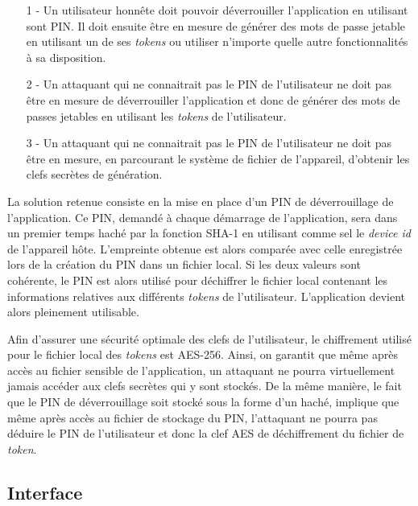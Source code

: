 \begin{itemize}
  \item[1 -] Un utilisateur honnête doit pouvoir déverrouiller l'application en utilisant 
  sont PIN. Il doit ensuite être en mesure de générer des mots de passe jetable en utilisant
  un de ses \emph{tokens} ou utiliser n'importe quelle autre fonctionnalités à sa
  disposition.
  \item[2 -] Un attaquant qui ne connaitrait pas le PIN de l'utilisateur ne doit pas être en
  mesure de déverrouiller l'application et donc de générer des mots de passes jetables en
  utilisant les \emph{tokens} de l'utilisateur.
  \item[3 -] Un attaquant qui ne connaitrait pas le PIN de l'utilisateur ne doit pas être en
  mesure, en parcourant le système de fichier de l'appareil, d'obtenir les clefs secrètes
  de génération.
\end{itemize}

La solution retenue consiste en la mise en place d'un PIN de déverrouillage de l'application.
Ce PIN, demandé à chaque démarrage de l'application, sera dans un premier temps haché par la
fonction SHA-1 en utilisant comme sel le \emph{device id} de l'appareil hôte. L'empreinte 
obtenue est alors comparée avec celle enregistrée lors de la création du PIN dans un fichier
local. Si les deux valeurs sont cohérente, le PIN est alors utilisé pour déchiffrer le
fichier local contenant les informations relatives aux différents \emph{tokens} de
l'utilisateur. L'application devient alors pleinement utilisable.

Afin d'assurer une sécurité optimale des clefs de l'utilisateur, le chiffrement utilisé pour
le fichier local des \emph{tokens} est AES-256. Ainsi, on garantit que même après accès au
fichier sensible de l'application, un attaquant ne pourra virtuellement jamais accéder aux
clefs secrètes qui y sont stockés. De la même manière, le fait que le PIN de déverrouillage
soit stocké sous la forme d'un haché, implique que même après accès au fichier de stockage du
PIN, l'attaquant ne pourra pas déduire le PIN de l'utilisateur et donc la clef AES de
déchiffrement du fichier de \emph{token}.


\subsection{Interface}





